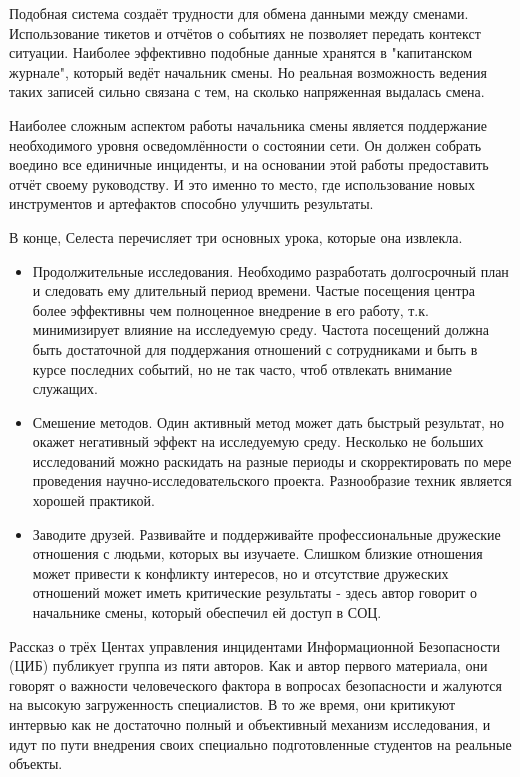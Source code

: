 \documentclass[10pt,a4paper]{article}
\begin{document}
\begin{multicols}{2}
Подобная система создаёт трудности для обмена данными между сменами. Использование тикетов и отчётов о событиях не позволяет передать контекст ситуации. Наиболее эффективно подобные данные хранятся в "капитанском журнале", который ведёт начальник смены. Но реальная возможность ведения таких записей сильно связана с тем, на сколько напряженная выдалась смена.

Наиболее сложным аспектом работы начальника смены является поддержание необходимого уровня осведомлённости о состоянии сети. Он должен собрать воедино все единичные инциденты, и на основании этой работы предоставить отчёт своему руководству. И это именно то место, где использование новых инструментов и артефактов способно улучшить результаты.

В конце, Селеста перечисляет три основных урока, которые она извлекла.

\begin{itemize}
\item Продолжительные исследования. Необходимо разработать долгосрочный план и следовать ему длительный период времени. Частые посещения центра более эффективны чем полноценное внедрение в его работу, т.к. минимизирует влияние на исследуемую среду. Частота посещений должна быть достаточной для поддержания отношений с сотрудниками и быть в курсе последних событий, но не так часто, чтоб отвлекать внимание служащих.

\item Смешение методов. Один активный метод может дать быстрый результат, но окажет негативный эффект на исследуемую среду. Несколько не больших исследований можно раскидать на разные периоды и скорректировать по мере проведения научно-исследовательского проекта. Разнообразие техник является хорошей практикой.

\item Заводите друзей. Развивайте и поддерживайте профессиональные дружеские отношения с людьми, которых вы изучаете. Слишком близкие отношения может привести к конфликту интересов, но и отсутствие дружеских отношений может иметь критические результаты - здесь автор говорит о начальнике смены, который обеспечил ей доступ в СОЦ.
\end{itemize}

Рассказ о трёх Центах управления инцидентами Информационной Безопасности (ЦИБ) публикует группа из пяти авторов. Как и автор первого материала, они говорят о важности человеческого фактора в вопросах безопасности и жалуются на высокую загруженность специалистов. В то же время, они критикуют интервью как не достаточно полный и объективный механизм исследования, и идут по пути внедрения своих специально подготовленные студентов на реальные объекты.


\end{multicols}
\end{document}

